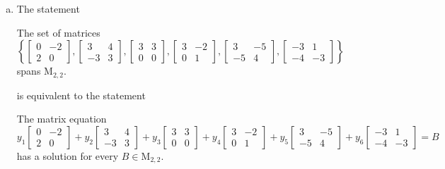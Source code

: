 \begin{exerciseAnswer}
\begin{enumerate}[(a)]
\item The statement 
\begin{center}\begin{minipage}{0.8\textwidth}
 The set of matrices \( \left\{ \left[\begin{array}{cc}
0 & -2 \\
2 & 0
\end{array}\right] , \left[\begin{array}{cc}
3 & 4 \\
-3 & 3
\end{array}\right] , \left[\begin{array}{cc}
3 & 3 \\
0 & 0
\end{array}\right] , \left[\begin{array}{cc}
3 & -2 \\
0 & 1
\end{array}\right] , \left[\begin{array}{cc}
3 & -5 \\
-5 & 4
\end{array}\right] , \left[\begin{array}{cc}
-3 & 1 \\
-4 & -3
\end{array}\right] \right\} \) spans \(\mathrm{M}_{2,2}\). 
\end{minipage}\end{center}
     is equivalent to the statement 
\begin{center}\begin{minipage}{0.8\textwidth}
 The matrix equation \[ y_{1} \left[\begin{array}{cc}
0 & -2 \\
2 & 0
\end{array}\right] + y_{2} \left[\begin{array}{cc}
3 & 4 \\
-3 & 3
\end{array}\right] + y_{3} \left[\begin{array}{cc}
3 & 3 \\
0 & 0
\end{array}\right] + y_{4} \left[\begin{array}{cc}
3 & -2 \\
0 & 1
\end{array}\right] + y_{5} \left[\begin{array}{cc}
3 & -5 \\
-5 & 4
\end{array}\right] + y_{6} \left[\begin{array}{cc}
-3 & 1 \\
-4 & -3
\end{array}\right] =B\] has a solution for every \(B \in \mathrm{M}_{2,2}\). 
\end{minipage}\end{center}
    

\end{enumerate}
\end{exerciseAnswer}
